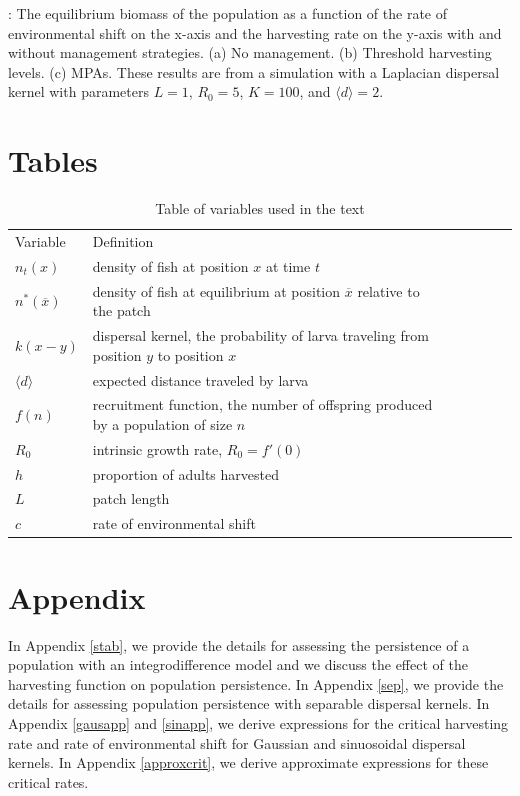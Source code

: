 \documentclass[12pt,english]{article}
\begin{document}
\pagebreak

: The equilibrium biomass of the population as a function of the rate of environmental shift on the x-axis and the harvesting rate on the y-axis with and without management strategies.  (a) No management.  (b) Threshold harvesting levels.  (c) MPAs.  These results are from a simulation with a Laplacian dispersal kernel with parameters $L=1$, $R_0=5$, $K=100$, and $\langle d \rangle =2$.

\pagebreak

\section{Tables}
\begin{table}[h]
\caption{Table of variables used in the text}
\begin{tabular}{@{}lllllll@{}}
  Variable & Definition
\\\cmidrule{1-1} \cmidrule{2-2}   
$n_t(x)$ & density of fish at position $x$ at time $t$
\\ $n^*(\overline{x})$ & density of fish at equilibrium at position $\overline{x}$ relative to the patch 
\\ $k(x-y)$ & dispersal kernel, the probability of larva traveling from position $y$ to position $x$
\\ $\langle d \rangle $ & expected distance traveled by larva
\\ $f(n)$ & recruitment function, the number of offspring produced by a population of size $n$
\\ $R_0$ & intrinsic growth rate, $R_0=f'(0)$
\\ $h$ & proportion of adults harvested
\\ $L$ & patch length
\\ $c$ & rate of environmental shift
\end{tabular}
\label{variables}
\end{table}

\pagebreak

\appendix
\section{Appendix}
In Appendix \ref{stab}, we provide the details for assessing the persistence of a population with an integrodifference model and we discuss the effect of the harvesting function on population persistence.  In Appendix \ref{sep}, we provide the details for assessing population persistence with separable dispersal kernels.  In Appendix \ref{gausapp} and \ref{sinapp}, we derive expressions for the critical harvesting rate and rate of environmental shift for Gaussian and sinuosoidal dispersal kernels.  In Appendix \ref{approxcrit}, we derive approximate expressions for these critical rates.
\end{document}
